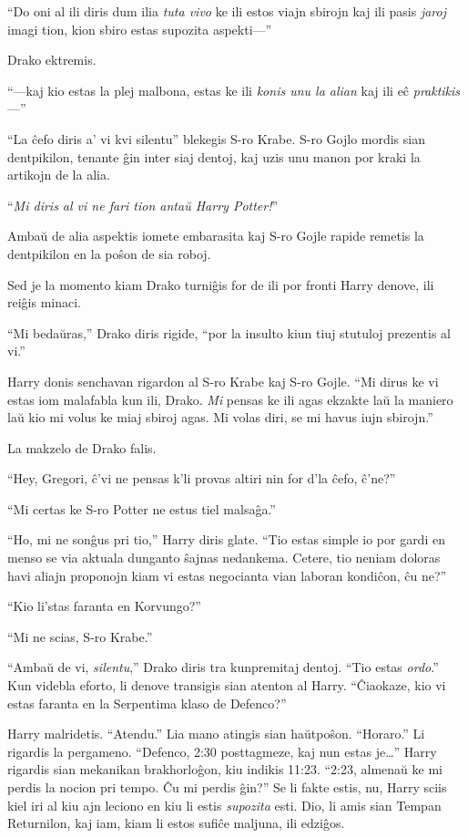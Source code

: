 ``Do oni al ili diris dum ilia \emph{tuta vivo} ke ili estos viajn
sbirojn kaj ili pasis \emph{jaroj} imagi tion, kion sbiro estas
supozita aspekti—''

Drako ektremis.

``—kaj kio estas la plej malbona, estas ke ili \emph{konis unu la
alian} kaj ili eĉ \emph{praktikis}—''

``La ĉefo diris a' vi kvi silentu'' blekegis S-ro Krabe. S-ro Gojlo
mordis sian dentpikilon, tenante ĝin inter siaj dentoj, kaj uzis unu
manon por kraki la artikojn de la alia.

``\emph{Mi diris al vi ne fari tion antaŭ Harry Potter!}''

Ambaŭ de alia aspektis iomete embarasita kaj S-ro Gojle rapide remetis
la dentpikilon en la poŝon de sia roboj.

Sed je la momento kiam Drako turniĝis for de ili por fronti Harry
denove, ili reiĝis minaci.

``Mi bedaŭras,'' Drako diris rigide, ``por la insulto kiun tiuj
stutuloj prezentis al vi.''

Harry donis senchavan rigardon al S-ro Krabe kaj S-ro Gojle. ``Mi
dirus ke vi estas iom malafabla kun ili, Drako. \emph{Mi} pensas ke
ili agas ekzakte laŭ la maniero laŭ kio mi volus ke miaj sbiroj
agas. Mi volas diri, se mi havus iujn sbirojn.''

La makzelo de Drako falis.

``Hey, Gregori, ĉ'vi ne pensas k'li provas altiri nin for d'la
ĉefo, ĉ'ne?''

``Mi certas ke S-ro Potter ne estus tiel malsaĝa.''

``Ho, mi ne sonĝus pri tio,'' Harry diris glate. ``Tio estas simple io
por gardi en menso se via aktuala dunganto ŝajnas nedankema. Cetere,
tio neniam doloras havi aliajn proponojn kiam vi estas negocianta vian
laboran kondiĉon, ĉu ne?''

``Kio li'stas faranta en Korvungo?''

``Mi ne scias, S-ro Krabe.''

``Ambaŭ de vi, \emph{silentu},'' Drako diris tra kunpremitaj
dentoj. ``Tio estas \emph{ordo}.'' Kun videbla eforto, li denove
transigis sian atenton al Harry. ``Ĉiaokaze, kio vi estas faranta en
la Serpentima klaso de Defenco?''

Harry malridetis. ``Atendu.'' Lia mano atingis sian
haŭtpoŝon. ``Horaro.'' Li rigardis la pergameno. ``Defenco, 2:30
posttagmeze, kaj nun estas je\ldots'' Harry rigardis sian mekanikan
brakhorloĝon, kiu indikis 11:23. ``2:23, almenaŭ ke mi perdis la
nocion pri tempo. Ĉu mi perdis ĝin?'' Se li fakte estis, nu, Harry
sciis kiel iri al kiu ajn leciono en kiu li estis \emph{supozita}
esti. Dio, li amis sian Tempan Returnilon, kaj iam, kiam li estos sufiĉe
maljuna, ili edziĝos.

